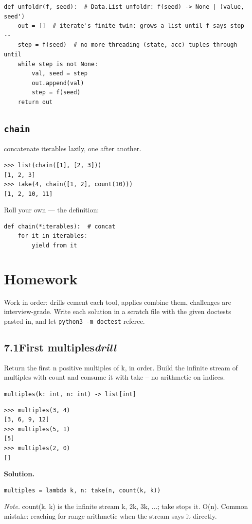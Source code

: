 \documentclass[10pt,letterpaper]{book}
\begin{document}
\begin{lstlisting}[style=ex]
def unfoldr(f, seed):  # Data.List unfoldr: f(seed) -> None | (value, seed')
    out = []  # iterate's finite twin: grows a list until f says stop --
    step = f(seed)  # no more threading (state, acc) tuples through until
    while step is not None:
        val, seed = step
        out.append(val)
        step = f(seed)
    return out
\end{lstlisting}

\subsection{\texttt{chain}}\label{def:chain}
concatenate iterables lazily, one after another.
\begin{lstlisting}[style=ex]
>>> list(chain([1], [2, 3]))
[1, 2, 3]
>>> take(4, chain([1, 2], count(10)))
[1, 2, 10, 11]
\end{lstlisting}

Roll your own --- the definition:

\begin{lstlisting}[style=ex]
def chain(*iterables):  # concat
    for it in iterables:
        yield from it
\end{lstlisting}

\section{Homework}
Work in order: drills cement each tool, applies combine them,
challenges are interview-grade. Write each solution in a scratch file with
the given doctests pasted in, and let \texttt{python3 -m doctest} referee.
\subsection*{7.1\quad First multiples\hfill\textnormal{\textit{drill}}}
Return the first n positive multiples of k, in order. Build the infinite stream of multiples with count and consume it with take -- no arithmetic on indices.

\noindent\texttt{multiples(k: int, n: int) -> list[int]}
\begin{lstlisting}[style=ex]
>>> multiples(3, 4)
[3, 6, 9, 12]
>>> multiples(5, 1)
[5]
>>> multiples(2, 0)
[]
\end{lstlisting}
\noindent\textbf{Solution.}
\begin{lstlisting}[style=code]
multiples = lambda k, n: take(n, count(k, k))
\end{lstlisting}
\noindent\textit{Note.} count(k, k) is the infinite stream k, 2k, 3k, ...; take stops it. O(n). Common mistake: reaching for range arithmetic when the stream says it directly.
\end{document}
